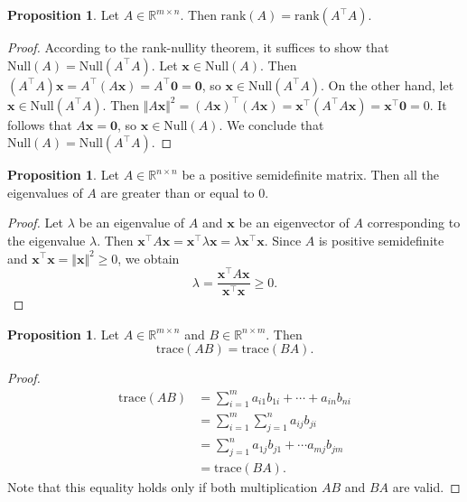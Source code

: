 \documentclass[12pt]{article}
\theoremstyle{definition}
\newtheorem{proposition}[theorem]{Proposition}
\begin{document}
\begin{proposition} \label{prop:preliminary_2}
    Let $A\in\mathbb{R}^{m\times n}$. Then $\mathrm{rank}(A) = \mathrm{rank}(A^\top A)$.
\end{proposition}
\begin{proof}
        According to the rank-nullity theorem, it suffices to show that $\mathrm{Null}(A) = \mathrm{Null}(A^\top A)$.
        Let $\mathbf{x}\in\mathrm{Null}(A)$. Then $(A^\top A)\mathbf{x} = A^\top (A\mathbf{x}) = A^\top \mathbf{0} = \mathbf{0}$, so $\mathbf{x}\in\mathrm{Null}(A^\top A)$.
        On the other hand, let $\mathbf{x}\in\mathrm{Null}(A^\top A)$. Then $\Vert A\mathbf{x}\Vert^2 = (A\mathbf{x})^\top (A\mathbf{x}) = \mathbf{x}^\top (A^\top A\mathbf{x}) = \mathbf{x}^\top \mathbf{0} = 0$. It follows that $A\mathbf{x} = \mathbf{0}$, so $\mathbf{x}\in\mathrm{Null}(A)$.
        We conclude that $\mathrm{Null}(A) = \mathrm{Null}(A^\top A)$.
\end{proof}

\begin{proposition} \label{prop:preliminary_3}
    Let $A\in\mathbb{R}^{n\times n}$ be a positive semidefinite matrix. Then all the eigenvalues of $A$ are greater than or equal to 0.
\end{proposition}
\begin{proof}
    Let $\lambda$ be an eigenvalue of $A$ and $\mathbf{x}$ be an eigenvector of $A$ corresponding to the eigenvalue $\lambda$. Then $\mathbf{x}^\top A\mathbf{x} = \mathbf{x}^\top \lambda\mathbf{x} = \lambda \mathbf{x}^\top \mathbf{x}$. Since $A$ is positive semidefinite and $\mathbf{x}^\top \mathbf{x} = \Vert \mathbf{x}\Vert^2 \geq 0$, we obtain
    \[ \lambda = \frac{\mathbf{x}^\top A\mathbf{x}}{\mathbf{x}^\top \mathbf{x}} \geq 0. \]
\end{proof}

\begin{proposition} \label{prop:trace_commutativity}
    Let $A\in\mathbb{R}^{m\times n}$ and $B\in\mathbb{R}^{n\times m}$. Then
    \[ \mathrm{trace}(AB) = \mathrm{trace}(BA). \]
\end{proposition}
\begin{proof}
    \[
    \begin{aligned}
        \mathrm{trace}(AB)
        &= \sum_{i=1}^m a_{i1}b_{1i} + \cdots + a_{in}b_{ni} \\
        &= \sum_{i=1}^m \sum_{j=1}^n a_{ij}b_{ji} \\
        &= \sum_{j=1}^n a_{1j}b_{j1} + \cdots a_{mj}b_{jm} \\
        &= \mathrm{trace}(BA).
    \end{aligned}
    \]
    Note that this equality holds only if both multiplication $AB$ and $BA$ are valid.
\end{proof}
\end{document}
